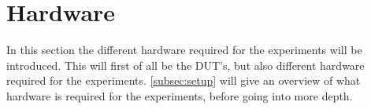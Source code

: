 \section{Hardware}\label{sec:hardware}



In this section the different hardware required for the experiments will be introduced. This will first of all be the DUT's, but also different hardware required for the experiments. \cref*{subsec:setup} will give an overview of what hardware is required for the experiments, before going into more depth.



%
